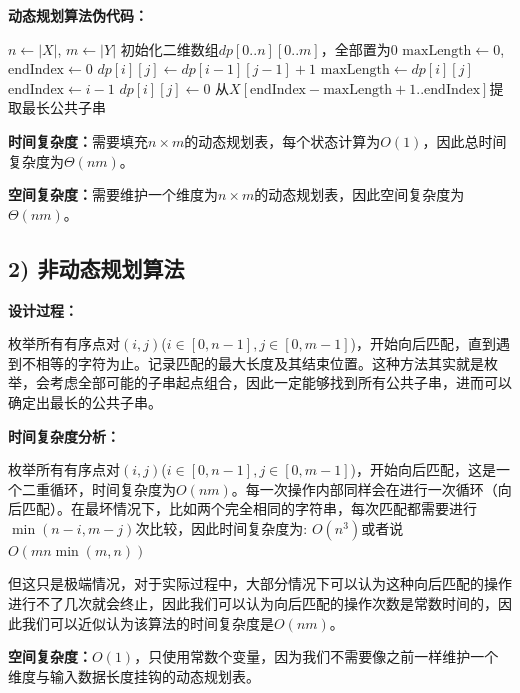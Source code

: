 \documentclass[UTF8,12pt,a4paper]{ctexart}
\begin{document}
\begin{enumerate}[1.]
	\textbf{动态规划算法伪代码：}
	\begin{algorithm}[H]%
		\caption{LCS-DP($X, Y$)}
		\begin{algorithmic}[1]
			\State $n \gets |X|$, $m \gets |Y|$
			\State 初始化二维数组$dp[0..n][0..m]$，全部置为0
			\State $\text{maxLength} \gets 0$, $\text{endIndex} \gets 0$
						\State $dp[i][j] \gets dp[i-1][j-1] + 1$
							\State $\text{maxLength} \gets dp[i][j]$
							\State $\text{endIndex} \gets i-1$ 
						\EndIf
					\Else
						\State $dp[i][j] \gets 0$
					\EndIf
				\EndFor
			\EndFor
			\State 从$X[\text{endIndex} - \text{maxLength} + 1..\text{endIndex}]$提取最长公共子串
			\State {}
		\end{algorithmic}
	\end{algorithm}

	\textbf{时间复杂度：}需要填充$n \times m$的动态规划表，每个状态计算为$O(1)$，因此总时间复杂度为$\Theta(nm)$。

	\textbf{空间复杂度：}需要维护一个维度为$n \times m$的动态规划表，因此空间复杂度为$\Theta(nm)$。

	\subsection*{2) 非动态规划算法}

	\textbf{设计过程：}
    
    枚举所有有序点对$(i, j)$($i \in [0, n-1], j \in  [0, m-1]$)，开始向后匹配，直到遇到不相等的字符为止。记录匹配的最大长度及其结束位置。这种方法其实就是枚举，会考虑全部可能的子串起点组合，因此一定能够找到所有公共子串，进而可以确定出最长的公共子串。
	
    \textbf{时间复杂度分析：}

	枚举所有有序点对$(i, j)$($i \in [0, n-1], j \in  [0, m-1]$)，开始向后匹配，这是一个二重循环，时间复杂度为$O(nm)$。每一次操作内部同样会在进行一次循环（向后匹配）。在最坏情况下，比如两个完全相同的字符串，每次匹配都需要进行$\min(n-i, m-j)$次比较，因此时间复杂度为: $O(n^3)$或者说$O(mn \min(m, n))$

	但这只是极端情况，对于实际过程中，大部分情况下可以认为这种向后匹配的操作进行不了几次就会终止，因此我们可以认为向后匹配的操作次数是常数时间的，因此我们可以近似认为该算法的时间复杂度是$O(nm)$。

	\textbf{空间复杂度：}$O(1)$，只使用常数个变量，因为我们不需要像之前一样维护一个维度与输入数据长度挂钩的动态规划表。
	

\end{enumerate}
\end{document}
